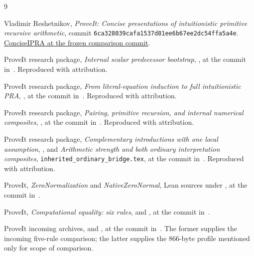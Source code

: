 \documentclass[11pt,letterpaper]{article}
\theoremstyle{definition}
\begin{document}
\clearpage
\begin{thebibliography}{9}
\raggedright
{}
Vladimir Reshetnikov, \emph{ProveIt: Concise presentations of
intuitionistic primitive recursive arithmetic}, commit
\texttt{6ca328039cafa1537d81ee6b67ee2dc54ffa5a4e}.
\href{https://github.com/VladimirReshetnikov/ProveIt/tree/6ca328039cafa1537d81ee6b67ee2dc54ffa5a4e/Logic/PrimitiveRecursiveArithmetic/ConciseIPRA}{ConciseIPRA at the frozen comparison commit}.

ProveIt research package, \emph{Internal scalar predecessor bootstrap},
,
at the commit in~\cite{baseline}. Reproduced with attribution.

ProveIt research package, \emph{From literal-equation induction to
full intuitionistic PRA},
,
at the commit in~\cite{baseline}. Reproduced with attribution.

ProveIt research package, \emph{Pairing, primitive recursion, and
internal numerical composites},
,
at the commit in~\cite{baseline}. Reproduced with attribution.

ProveIt research package, \emph{Complementary introductions with
one local assumption},
,
and \emph{Arithmetic strength and both ordinary interpretation
composites},
\texttt{inherited\_ordinary\_bridge.tex},
at the commit in~\cite{baseline}. Reproduced with attribution.

ProveIt, \emph{ZeroNormalization} and \emph{NativeZeroNormal},
Lean sources under , at the commit
in~\cite{baseline}.

ProveIt, \emph{Computational equality: six rules},
 and
, at the commit
in~\cite{baseline}.

ProveIt incoming archives,
 and
,
at the commit in~\cite{baseline}. The former supplies the incoming
five-rule comparison; the latter supplies the 866-byte profile
mentioned only for scope of comparison.
\end{thebibliography}
\end{document}
